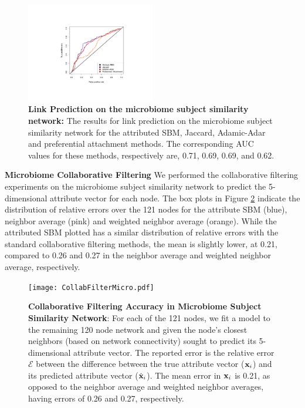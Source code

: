 \begin{figure}
\begin{center}
\includegraphics[width=0.5\textwidth]{ROC_Microbiome.pdf}
\caption{{\bf Link Prediction on the microbiome subject similarity network:} The results for link prediction on the microbiome subject similarity network for the attributed SBM, Jaccard, Adamic-Adar and preferential attachment methods. The corresponding AUC values for these methods, respectively are, 0.71, 0.69, 0.69, and 0.62.}
\label{AttFig5}
\end{center}
\end{figure}

{\bf Microbiome Collaborative Filtering}
We performed the collaborative filtering experiments on the microbiome subject similarity network to predict the 5-dimensional attribute vector for each node. The box plots in Figure \ref{AttFig6} indicate the distribution of relative errors over the 121 nodes for the attribute SBM (blue), neighbor average (pink) and weighted neighbor average (orange). While the attributed SBM plotted has a similar distribution of relative errors with the standard collaborative filtering methods, the mean is slightly lower, at 0.21, compared to 0.26 and 0.27 in the neighbor average and weighted neighbor average, respectively.
\begin{figure}[h!]
\begin{center}
\texttt{[image: CollabFilterMicro.pdf]}
\caption{{\bf Collaborative Filtering Accuracy in Microbiome Subject Similarity Network}: For each of the 121 nodes, we fit a model to the remaining 120 node network and given the node's closest  neighbors (based on network connectivity) sought to predict its 5-dimensional attribute vector. The reported error is the relative error $\mathcal{E}$ between the difference between the true attribute vector (${\bf x}_{i}$) and its predicted attribute vector (${\hat{\bf x}}_{i}$). The mean error in ${\bf x}_{i}$ is 0.21, as opposed to the neighbor average and weighted neighbor averages, having errors of 0.26 and 0.27, respectively. }
\label{AttFig6}
\end{center}
\end{figure}


